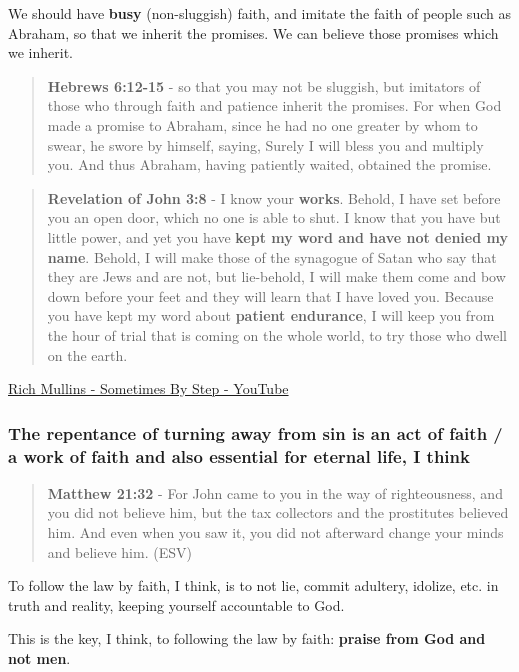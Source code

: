 \documentclass[11pt]{article}
\begin{document}
We should have \textbf{busy} (non-sluggish) faith,
and imitate the faith of people such as
Abraham, so that we inherit the promises.
We can believe those promises which we inherit.

\begin{quote}
\textbf{Hebrews 6:12-15} - so that you may not be sluggish, but imitators of those who through faith and patience inherit the promises. For when God made a promise to Abraham, since he had no one greater by whom to swear, he swore by himself, saying, Surely I will bless you and multiply you. And thus Abraham, having patiently waited, obtained the promise.
\end{quote}

\begin{quote}
\textbf{Revelation of John 3:8} - I know your \textbf{works}. Behold, I have set before you an open door, which no one is able to shut. I know that you have but little power, and yet you have \textbf{kept my word and have not denied my name}. Behold, I will make those of the synagogue of Satan who say that they are Jews and are not, but lie-behold, I will make them come and bow down before your feet and they will learn that I have loved you. Because you have kept my word about \textbf{patient endurance}, I will keep you from the hour of trial that is coming on the whole world, to try those who dwell on the earth.
\end{quote}

\href{https://www.youtube.com/watch?v=GamlYvhJyiM}{Rich Mullins - Sometimes By Step - YouTube}

\subsubsection{The repentance of turning away from sin is an act of faith / a work of faith and also essential for eternal life, I think}
\label{sec:org679d98e}
\begin{quote}
\textbf{Matthew 21:32} - For John came to you in the way of righteousness, and you did not believe him, but the tax collectors and the prostitutes believed him. And even when you saw it, you did not afterward change your minds and believe him. (ESV)
\end{quote}

To follow the law by faith, I think, is to not lie, commit adultery, idolize, etc. in truth and reality, keeping yourself accountable to God.

This is the key, I think, to following the law by faith: \textbf{praise from God and not men}.
\end{document}
